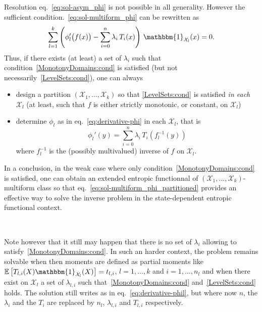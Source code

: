 \documentclass[english,sort&compress]{elsarticle}
\theoremstyle{definition}
\theoremstyle{plain}
\theoremstyle{plain}
\def\X{\mathcal{X}}
\def\un{\mathbbm{1}}
\newcommand{\Esp}[1]{\mathbb{E}\left[ #1 \right]}
\begin{document}
Resolution  eq.~\eqref{eq:sol-asym_phi}  is  not  possible  in  all  generality.
However the sufficient  condition.~\eqref{eq:sol-multiform_phi} can be rewritten
as
%
\begin{equation}\label{eq:sol-multiform_phi_partitioned}
\sum_{l=1}^k \left( \phi_l'\big(f(x)\big) - \sum_{i=0}^n \lambda_i \, T_i(x)
\right) \, \un_{\X_l}(x) = 0.
\end{equation}
%
Thus,   if  there   exists  (at   least)  a   set  of   $\lambda_i$   such  that
condition~\ref{MonotonyDomains:cond}       is      satisfied       (but      not
necessarily~\ref{LevelSets:cond}), one can always
%
\begin{itemize}
\item design  a partition  $(\X_1,\ldots,\X_k)$ so that  \ref{LevelSets:cond} is
  satisfied {\em  in each $\X_l$}  (at least, such  that $f$ is  either strictly
  monotonic, or constant, on $\X_l$)
\item  determine $\phi_l$  as in  eq.~\eqref{eq:derivative-phi} in  each $\X_l$,
  that is
    \begin{equation}\label{eq:derivative-phil}
    \phi_l'(y) = \sum_{i=0}^n \lambda_i \, T_i\!\left(f_l^{-1}(y)\right)
    \end{equation}
    where $f_l^{-1}$ is the (possibly multivalued) inverse of $f$ on $\X_l$.
\end{itemize}

In      a     conclusion,      in     the      weak     case      where     only
condition~\ref{MonotonyDomains:cond}  is satisfied, one  can obtain  an extended
entropic   functionnal   of   $(\X_1,\ldots,\X_k)$-multiform   class   so   that
eq.~\eqref{eq:sol-multiform_phi_partitioned} provides an  effective way to solve
the inverse problem in the state-dependent entropic functional context.

\

Note  however that  it still  may happen  that there  is no  set  of $\lambda_i$
allowing to satisfy~\ref{MonotonyDomains:cond}.  In  such an harder context, the
problem remains solvable  when then moments are defined  as partial moments like
$\Esp{T_{l,i}(X) \un_{\X_l}(X)} =  t_{l,i}$, $l = 1 ,  \ldots , k$ and $i  = 1 ,
\ldots  , n_l$ and  when there  exist on  $\X_l$ a  set of  $\lambda_{l,i}$ such
that~\ref{MonotonyDomains:cond}  and~\ref{LevelSets:cond}  holds.  The  solution
still  writes  as in  eq.~\eqref{eq:derivative-phil},  but  where  now $n$,  the
$\lambda_i$ and the  $T_i$ are replaced by $n_l$,  $\lambda_{l,i}$ and $T_{l,i}$
respectively.
\end{document}
